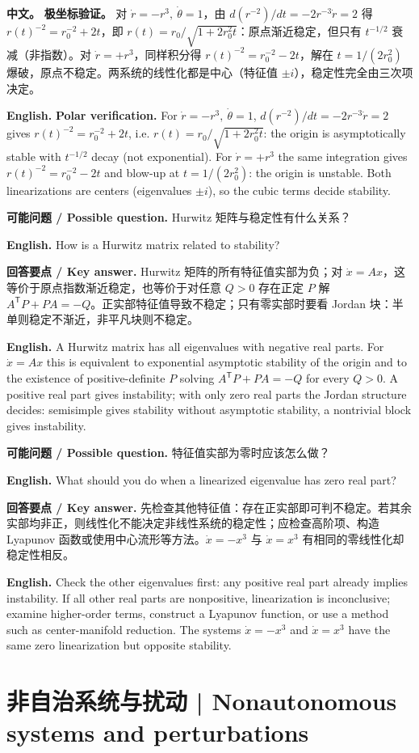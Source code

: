 \documentclass[UTF8,11pt,a4paper]{ctexart}
\newcommand{\EN}[1]{\par\noindent\textbf{English.} #1\par}
\newcommand{\ASK}[4]{\begin{samepage}\par\noindent\textbf{可能问题 / Possible question.} #1\par\EN{#2}\noindent\textbf{回答要点 / Key answer.} #3\par\EN{#4}\smallskip\end{samepage}}
\newcommand{\APS}[2]{\par\noindent\textbf{中文。} #1\par\noindent\textbf{English.} #2\par}
\begin{document}
\APS{\textbf{极坐标验证。} 对 $\dot r=-r^3,\ \dot\theta=1$，由 $d(r^{-2})/dt=-2r^{-3}\dot r=2$ 得 $r(t)^{-2}=r_0^{-2}+2t$，即 $r(t)=r_0/\sqrt{1+2r_0^2t}$：原点渐近稳定，但只有 $t^{-1/2}$ 衰减（非指数）。对 $\dot r=+r^3$，同样积分得 $r(t)^{-2}=r_0^{-2}-2t$，解在 $t=1/(2r_0^2)$ 爆破，原点不稳定。两系统的线性化都是中心（特征值 $\pm i$），稳定性完全由三次项决定。}{\textbf{Polar verification.} For $\dot r=-r^3,\ \dot\theta=1$, $d(r^{-2})/dt=-2r^{-3}\dot r=2$ gives $r(t)^{-2}=r_0^{-2}+2t$, i.e. $r(t)=r_0/\sqrt{1+2r_0^2t}$: the origin is asymptotically stable with $t^{-1/2}$ decay (not exponential). For $\dot r=+r^3$ the same integration gives $r(t)^{-2}=r_0^{-2}-2t$ and blow-up at $t=1/(2r_0^2)$: the origin is unstable. Both linearizations are centers (eigenvalues $\pm i$), so the cubic terms decide stability.}

\ASK{Hurwitz 矩阵与稳定性有什么关系？}{How is a Hurwitz matrix related to stability?}{Hurwitz 矩阵的所有特征值实部为负；对 $\dot x=Ax$，这等价于原点指数渐近稳定，也等价于对任意 $Q>0$ 存在正定 $P$ 解 $A^{\mathsf T}P+PA=-Q$。正实部特征值导致不稳定；只有零实部时要看 Jordan 块：半单则稳定不渐近，非平凡块则不稳定。}{A Hurwitz matrix has all eigenvalues with negative real parts. For $\dot x=Ax$ this is equivalent to exponential asymptotic stability of the origin and to the existence of positive-definite $P$ solving $A^{\mathsf T}P+PA=-Q$ for every $Q>0$. A positive real part gives instability; with only zero real parts the Jordan structure decides: semisimple gives stability without asymptotic stability, a nontrivial block gives instability.}

\ASK{特征值实部为零时应该怎么做？}{What should you do when a linearized eigenvalue has zero real part?}{先检查其他特征值：存在正实部即可判不稳定。若其余实部均非正，则线性化不能决定非线性系统的稳定性；应检查高阶项、构造 Lyapunov 函数或使用中心流形等方法。$\dot x=-x^3$ 与 $\dot x=x^3$ 有相同的零线性化却稳定性相反。}{Check the other eigenvalues first: any positive real part already implies instability. If all other real parts are nonpositive, linearization is inconclusive; examine higher-order terms, construct a Lyapunov function, or use a method such as center-manifold reduction. The systems $\dot x=-x^3$ and $\dot x=x^3$ have the same zero linearization but opposite stability.}

\section{非自治系统与扰动 | Nonautonomous systems and perturbations}
\end{document}
